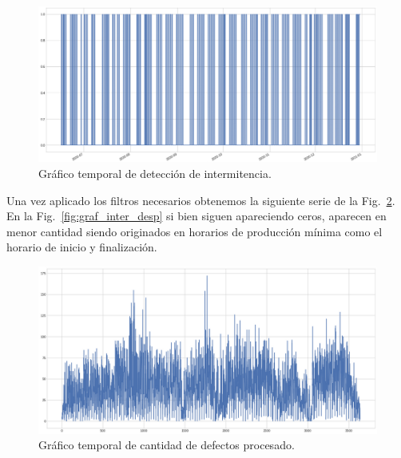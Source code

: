 \documentclass[a4paper,12pt]{article}
\begin{document}
		\begin{figure}[H]
			\begin{center}
				\includegraphics[width=1\textwidth]{tesis_79.png}
				\caption{Gráfico temporal de detección de intermitencia.}
				\label{fig:graf_inter_antes}
			\end{center}
		\end{figure}
				
				
				
		Una vez aplicado los filtros necesarios obtenemos la siguiente serie de la Fig.~\ref{fig:graf_cantdef_desp}. En la Fig.~\ref{fig:graf_inter_desp} si bien siguen apareciendo ceros, aparecen en menor cantidad siendo originados en horarios de producción mínima como el horario de inicio y finalización.
				
		\begin{figure}[H]
			\begin{center}
				\includegraphics[width=1\textwidth]{tesis_80.png}
				\caption{Gráfico temporal de cantidad de defectos procesado.}
				\label{fig:graf_cantdef_desp}
			\end{center}
		\end{figure}
				
\end{document}
